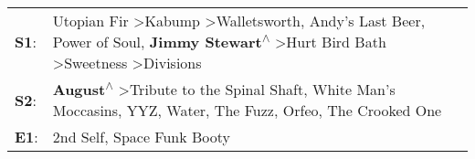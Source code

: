\begin{supertabular}{p{0.03\textwidth}p{0.92\textwidth}}
 \textbf{S1}:  &  Utopian Fir\textsuperscript{} \textgreater \enspace Kabump\textsuperscript{} \textgreater \enspace Walletsworth\textsuperscript{}, \enspace Andy's Last Beer\textsuperscript{}, \enspace Power of Soul\textsuperscript{}, \enspace \textbf{Jimmy Stewart\textsuperscript{$\wedge$}} \textgreater \enspace Hurt Bird Bath\textsuperscript{} \textgreater \enspace Sweetness\textsuperscript{} \textgreater \enspace Divisions\textsuperscript{}  \enspace  \\
 \textbf{S2}:  &                                                                                            \textbf{August\textsuperscript{$\wedge$}} \textgreater \enspace Tribute to the Spinal Shaft\textsuperscript{}, \enspace White Man's Moccasins\textsuperscript{}, \enspace YYZ\textsuperscript{}, \enspace Water\textsuperscript{}, \enspace The Fuzz\textsuperscript{}, \enspace Orfeo\textsuperscript{}, \enspace The Crooked One\textsuperscript{}  \enspace  \\
 \textbf{E1}:  &                                                                                                                                                                                                                                                                                                                                                                         2nd Self\textsuperscript{}, \enspace Space Funk Booty\textsuperscript{}  \enspace  \\
\end{supertabular}
